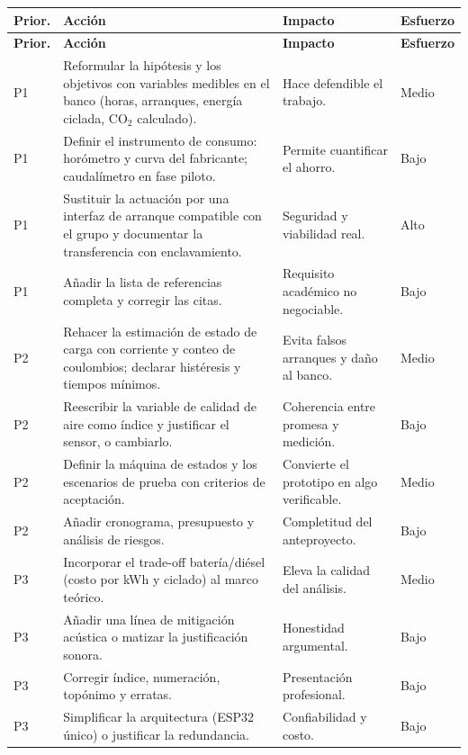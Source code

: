 \documentclass[11pt,a4paper]{article}
\begin{document}
\begingroup\small
\begin{longtable}{@{}>{\centering\arraybackslash}p{1.0cm} >{\raggedright\arraybackslash}p{6.0cm} >{\raggedright\arraybackslash}p{4.4cm} >{\raggedright\arraybackslash}p{3.4cm}@{}}
\toprule
\textbf{Prior.} & \textbf{Acción} & \textbf{Impacto} & \textbf{Esfuerzo} \\
\midrule
\endfirsthead
\toprule
\textbf{Prior.} & \textbf{Acción} & \textbf{Impacto} & \textbf{Esfuerzo} \\
\midrule
\endhead
P1 & Reformular la hipótesis y los objetivos con variables medibles en el banco (horas, arranques, energía ciclada, CO$_2$ calculado). & Hace defendible el trabajo. & Medio \\
P1 & Definir el instrumento de consumo: horómetro y curva del fabricante; caudalímetro en fase piloto. & Permite cuantificar el ahorro. & Bajo \\
P1 & Sustituir la actuación por una interfaz de arranque compatible con el grupo y documentar la transferencia con enclavamiento. & Seguridad y viabilidad real. & Alto \\
P1 & Añadir la lista de referencias completa y corregir las citas. & Requisito académico no negociable. & Bajo \\
P2 & Rehacer la estimación de estado de carga con corriente y conteo de coulombios; declarar histéresis y tiempos mínimos. & Evita falsos arranques y daño al banco. & Medio \\
P2 & Reescribir la variable de calidad de aire como índice y justificar el sensor, o cambiarlo. & Coherencia entre promesa y medición. & Bajo \\
P2 & Definir la máquina de estados y los escenarios de prueba con criterios de aceptación. & Convierte el prototipo en algo verificable. & Medio \\
P2 & Añadir cronograma, presupuesto y análisis de riesgos. & Completitud del anteproyecto. & Bajo \\
P3 & Incorporar el trade-off batería/diésel (costo por kWh y ciclado) al marco teórico. & Eleva la calidad del análisis. & Medio \\
P3 & Añadir una línea de mitigación acústica o matizar la justificación sonora. & Honestidad argumental. & Bajo \\
P3 & Corregir índice, numeración, topónimo y erratas. & Presentación profesional. & Bajo \\
P3 & Simplificar la arquitectura (ESP32 único) o justificar la redundancia. & Confiabilidad y costo. & Bajo \\
\bottomrule
\end{longtable}
\endgroup
\end{document}
